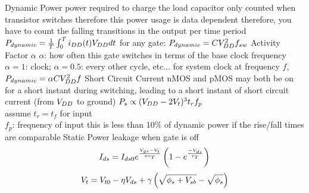 \documentclass[12pt]{article}
\begin{document}
\begin{spacing}{0.8}
\begin{multicols*}{2}
\begin{flushleft}
\begin{outline}[longenum]
  \1 Dynamic Power
    \2 power required to charge the load capacitor
    \2 only counted when transistor switches
      \3 therefore this power usage is data dependent
      \3 therefore, you have to count the falling transitions in the output per time period
    \2 $P_{dynamic} = \frac{1}{T}\int_0^T i_{DD}(t) V_{DD} dt$
    \2 for any gate: $P_{dynamic} = C V_{DD}^2 f_{sw}$
  \1 Activity Factor $\alpha$
    \2 $\alpha$: how often this gate switches in terms of the base clock frequency
    \2 $\alpha=1$: clock; $\alpha=0.5$: every other cycle, etc...
    \2 for system clock at frequency $f$, $P_{dynamic} = \alpha C V_{DD}^2 f$
  \1 Short Circuit Current
    \2 nMOS and pMOS may both be on for a short instant during switching, leading to a short instant of short circuit current (from $V_{DD}$ to ground)
    \2 $P_s \propto (V_{DD} -2V_t)^3 t_r f_p$
      \\ assume $t_r=t_f$ for input
      \\ $f_p$: frequency of input
    \2 this is less than $10\%$ of dynamic power if the rise/fall times are comparable
  \1 Static Power
    \2 leakage when gate is off
    \2 
    $$ I_{ds} = I_{ds0} e^{\frac{V_{gs}-V_{t}}{nv_T}} \left( 1 - e^{\frac{-V_{ds}}{v_T}} \right) $$
    $$ V_t = V_{t0} - \eta V_{ds} + \gamma \left( \sqrt{\phi_s + V_{sb}} - \sqrt{\phi_s} \right) $$




\end{outline}
\end{flushleft}
\end{multicols*}
\end{spacing}
\end{document}
